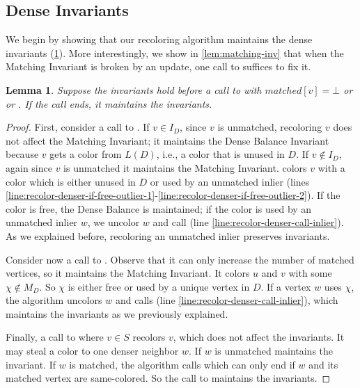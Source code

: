 \documentclass[a4paper,english,11pt]{amsart}
\newtheorem{lemma}{Lemma}[section]
\theoremstyle{definition}
\begin{document}
\subsection{Dense Invariants}
\label{sec:invariants}

We begin by showing that our recoloring algorithm maintains the dense invariants (\cref{lem:recolor-denser-matching-invariants}). More interestingly, we show in \cref{lem:matching-inv} that when the Matching Invariant is broken by an update, one call to \AddAntiEdgeMatching suffices to fix it.


\begin{lemma}
    \label{lem:recolor-denser-matching-invariants}
    Suppose the invariants hold before a call to  with $matched[v]=\bot$ or  or . If the call ends, it maintains the invariants.
\end{lemma}
\begin{proof}
    First, consider a call to . If $v \in I_D$, since $v$ is unmatched, recoloring $v$ does not affect the Matching Invariant; it maintains the Dense Balance Invariant because $v$ gets a color from $L(D)$, i.e., a color that is unused in $D$. If $v \notin I_D$, again since $v$ is unmatched it maintains the Matching Invariant.  colors $v$ with a color which is either unused in $D$ or used by an unmatched inlier (lines \ref{line:recolor-denser-if-free-outlier-1}-\ref{line:recolor-denser-if-free-outlier-2}). If the color is free, the Dense Balance is maintained; if the color is used by an unmatched inlier $w$, we uncolor $w$ and call  (line \ref{line:recolor-denser-call-inlier}). As we explained before, recoloring an unmatched inlier preserves invariants.

    Consider now a call to . Observe that it can only increase the number of matched vertices, so it maintains the Matching Invariant. It colors $u$ and $v$ with some $\chi \notin M_D$. So $\chi$ is either free or used by a unique vertex in $D$. If a vertex $w$ uses $\chi$, the algorithm uncolors $w$ and calls  (line \ref{line:recolor-denser-call-inlier}), which maintains the invariants as we previously explained.


    Finally, a call to  where $v\in S$ recolors $v$, which does not affect the invariants. It may steal a color to one denser neighbor $w$. If $w$ is unmatched  maintains the invariant. If $w$ is matched, the algorithm calls  which can only end if $w$ and its matched vertex are same-colored. So the call to \RecolorSparse maintains the invariants.
\end{proof}
\end{document}
